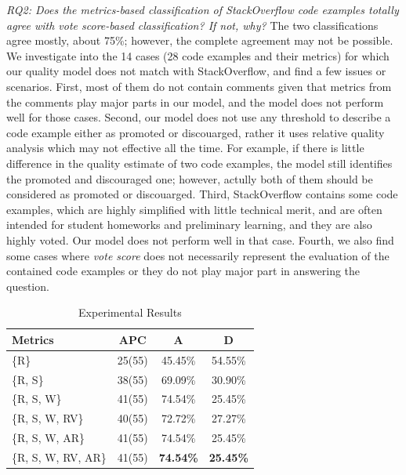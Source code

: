 \documentclass{sig-alternate}
\begin{document}
\emph{RQ2: Does the metrics-based classification of StackOverflow code examples totally agree with vote score-based classification? If not, why?} The two classifications agree mostly, about 75\%; however, the complete agreement may not be possible. We investigate into the 14 cases (28 code examples and their metrics) for which our quality model does not match with StackOverflow, and find a few issues or scenarios. First, most of them do not contain comments given that metrics from the comments play major parts in our model, and the model does not perform well for those cases. Second, our model does not use any threshold to describe a code example either as promoted or discouarged, rather it uses relative quality analysis which may not effective all the time. For example, if there is little difference in the quality estimate of two code examples, the model still identifies the promoted and discouraged one; however, actully both of them should be considered as promoted or discouarged. Third, StackOverflow contains some code examples, which are highly simplified with little technical merit, and are often intended for student homeworks and preliminary learning, and they are also highly voted. Our model does not perform well in that case. Fourth, we also find some cases where \emph{vote score} does not necessarily represent the evaluation of the contained code examples or they do not play major part in answering the question.

\begin{table}
\label{table:result}
\centering
\caption{Experimental Results}
\begin{tabular}{l|c|c|c}
\hline
\textbf{Metrics} & \textbf{APC} & \textbf{A} & \textbf{D}\\
\hline
\{R\} & 25(55) & 45.45\% & 54.55\%\\
\hline
\{R, S\} & 38(55) & 69.09\% & 30.90\%\\
\hline
\{R, S, W\} & 41(55) & 74.54\% & 25.45\% \\
\hline
\{R, S, W, RV\} & 40(55) & 72.72\% & 27.27\% \\
\hline
\{R, S, W, AR\} &  41(55) & 74.54\% & 25.45\% \\
\hline
\{R, S, W, RV, AR\} & 41(55) & \textbf{74.54\%} & \textbf{25.45\%} \\
\hline\end{tabular}
\end{table}
\end{document}
